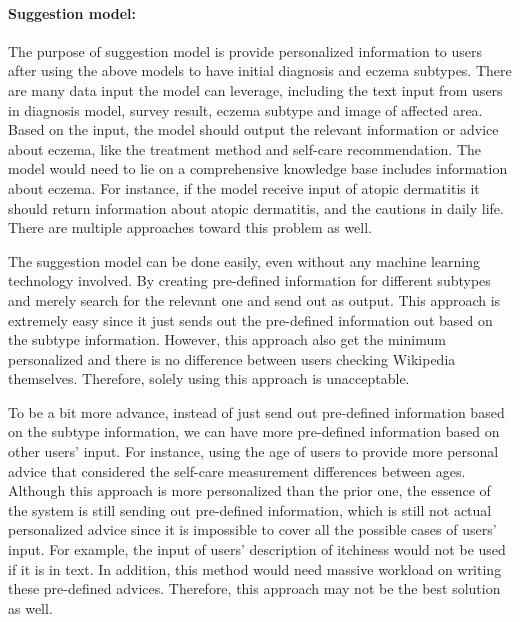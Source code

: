                 \paragraph{Suggestion model:} \label{suggestion}
                    The purpose of suggestion model is provide personalized information to users after using the above models to have initial diagnosis and eczema subtypes. There are many data input the model can leverage, including the text input from users in diagnosis model, survey result, eczema subtype and image of affected area. Based on the input, the model should output the relevant information or advice about eczema, like the treatment method and self-care recommendation. The model would need to lie on a comprehensive knowledge base includes information about eczema. For instance, if the model receive input of atopic dermatitis it should return information about atopic dermatitis, and the cautions in daily life. There are multiple approaches toward this problem as well.

                    The suggestion model can be done easily, even without any machine learning technology involved. By creating pre-defined information for different subtypes and merely search for the relevant one and send out as output. This approach is extremely easy since it just sends out the pre-defined information out based on the subtype information. However, this approach also get the minimum personalized and there is no difference between users checking Wikipedia themselves. Therefore, solely using this approach is unacceptable.

                    To be a bit more advance, instead of just send out pre-defined information based on the subtype information, we can have more pre-defined information based on other users' input. For instance, using the age of users to provide more personal advice that considered the self-care measurement differences between ages. Although this approach is more personalized than the prior one, the essence of the system is still sending out pre-defined information, which is still not actual personalized advice since it is impossible to cover all the possible cases of users' input. For example, the input of users' description of itchiness would not be used if it is in text. In addition, this method would need massive workload on writing these pre-defined advices. Therefore, this approach may not be the best solution as well.

